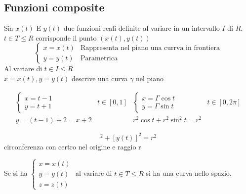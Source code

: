 \subsection{Funzioni composite}
\begin{defi}
  Sia $x(t)$ E $y(t)$ due funzioni reali definite al variare in un intervallo $I$ di $R$.
  $t\in T \leq R$ corrisponde il punto $(x(t),y(t))$
  \begin{equation*}
    \begin{cases}
      x=x(t) & \text{Rappresenta nel piano una currva in frontiera}\\
      y=y(t) & \text{Parametrica}
    \end{cases}
  \end{equation*}
  Al variare di $t\in I\leq R$\\
  $x=x(t),y=y(t)$ descrive una curva $\gamma$ nel piano 
\end{defi}
\clearpage
\begin{esempio}
  \begin{equation*}
    \begin{matrix}
    \begin{cases}
        x=t-1\\
        y=t+1
    \end{cases}& t\in [0,1] &
    \begin{cases}
        x=\Gamma \cos t\\
        y=\Gamma \sin t
    \end{cases}& t\in [0,2\pi]\\
      y=(t-1)+2=x+2 && r^2\cos t+ r^2\sin^2t=r^2
    \end{matrix}
  \end{equation*}
  \begin{multicols}{2}
      \begin{equation*}
      	[x(t)]^2+[y(t)]^2=r^2
      \end{equation*}
      circonferenza con certro nel origine e raggio r
    \end{multicols}
    Se si ha $\begin{cases} x=x(t) \\ y=y(t) \\ z=z(t)\end{cases}$ al variare di $t\in T \leq R$ si
    ha una curva nello spazio.
\end{esempio}
